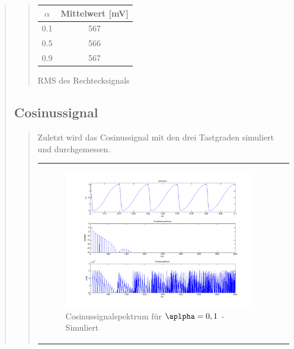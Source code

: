 \begin{quote}
\begin{quote}
                     
            \begin{center}
                  \begin{tabular}{|c|c|}
                  \hline
                   $\alpha $ &  Mittelwert [mV] \\ \hline 
                   0.1 &  567 \\ \hline
                   0.5 &  566 \\ \hline
                   0.9 &  567 \\ \hline           
                 \end{tabular}
                       \caption{RMS des Rechtecksignals}
                        \label{tablelabel1}
             \end{center}
        
    \end{quote}
    
    \subsection{Cosinussignal}
    \begin{quote}
    
    	Zuletzt wird das Cosinussignal mit den drei Tastgraden simuliert und
    	durchgemessen.
        
        
            \begin{center}
            \begin{tabular}{ll}

            \hspace{-12em}
                \begin{minipage}{0.6\textwidth}

                    \begin{figure}[H]
                        \label{fig:}            
                        \includegraphics[scale=0.25]{./Bilder/cos_alpha1.png} %
                        \caption{Cosinussignalspektrum für $\aplpha = 0,1$ - Simuliert}
                    \end{figure}


\end{minipage}
\end{tabular}
\end{center}
\end{quote}
\end{quote}
